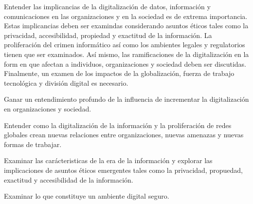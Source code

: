 \begin{syllabus}


\begin{justification}
Entender las implicancias de la digitalización de datos, información y comunicaciones en las organizaciones y en la sociedad es de extrema importancia. Estas implicancias deben ser examindas considerando asuntos éticos tales como la privacidad, accesibilidad, propiedad y exactitud de la información. La proliferación del crimen informático así­ como los ambientes legales y regulatorios tienen que ser examinados. Así­ mismo, las ramificaciones de la digitalización en la form en que afectan a individuos, organizaciones y sociedad deben ser discutidas. Finalmente, un examen de los impactos de la globalización, fuerza de trabajo tecnológica y división digital es necesario.
\end{justification}

\begin{goals}
\item Ganar un entendimiento profundo de la influencia de incrementar la digitalización en organizaciones y sociedad.
\item Entender como la digitalización de la información y la proliferación de redes globales crean nuevas relaciones entre organizaciones, nuevas amenazas y nuevas formas de trabajar.
\item Examinar las carácteristicas de la era de la información y explorar las implicaciones de asuntos éticos emergentes tales como la privacidad, propuedad, exactitud y accesibilidad de la información.
\item Examinar lo que constituye un ambiente digital seguro.
\end{goals}

\begin{outcomes}
\end{outcomes}


\end{syllabus}

